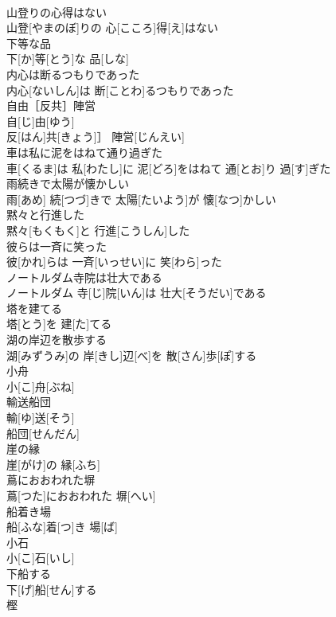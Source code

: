 \documentclass[8pt]{extreport}
\begin{document}
\begin{CJK}{UTF8}{min}
\\	山登りの心得はない	
\\	山登[やまのぼ]りの 心[こころ]得[え]はない
\\	下等な品	
\\	下[か]等[とう]な 品[しな]
\\	内心は断るつもりであった	
\\	内心[ないしん]は 断[ことわ]るつもりであった
\\	自由［反共］陣営	
\\	自[じ]由[ゆう]
\\	反[はん]共[きょう]］ 陣営[じんえい]
\\	車は私に泥をはねて通り過ぎた	
\\	車[くるま]は 私[わたし]に 泥[どろ]をはねて 通[とお]り 過[す]ぎた
\\	雨続きで太陽が懐かしい	
\\	雨[あめ] 続[つづ]きで 太陽[たいよう]が 懐[なつ]かしい
\\	黙々と行進した	
\\	黙々[もくもく]と 行進[こうしん]した
\\	彼らは一斉に笑った	
\\	彼[かれ]らは 一斉[いっせい]に 笑[わら]った
\\	ノートルダム寺院は壮大である	
\\	ノートルダム 寺[じ]院[いん]は 壮大[そうだい]である
\\	塔を建てる	
\\	塔[とう]を 建[た]てる
\\	湖の岸辺を散歩する	
\\	湖[みずうみ]の 岸[きし]辺[べ]を 散[さん]歩[ぽ]する
\\	小舟	
\\	小[こ]舟[ぶね]
\\	輸送船団	
\\	輸[ゆ]送[そう]
\\	船団[せんだん]
\\	崖の縁	
\\	崖[がけ]の 縁[ふち]
\\	蔦におおわれた塀	
\\	蔦[つた]におおわれた 塀[へい]
\\	船着き場	
\\	船[ふな]着[つ]き 場[ば]
\\	小石	
\\	小[こ]石[いし]
\\	下船する	
\\	下[げ]船[せん]する
\\	樫	

\end{CJK}
\end{document}
